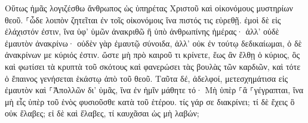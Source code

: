 \documentclass{openreader}
\begin{document}
Οὕτως ἡμᾶς λογιζέσθω ἄνθρωπος ὡς ὑπηρέτας Χριστοῦ καὶ οἰκονόμους μυστηρίων θεοῦ. 
⸀ὧδε λοιπὸν ζητεῖται ἐν τοῖς οἰκονόμοις ἵνα πιστός τις εὑρεθῇ. 
ἐμοὶ δὲ εἰς ἐλάχιστόν ἐστιν, ἵνα ὑφ’ ὑμῶν ἀνακριθῶ ἢ ὑπὸ ἀνθρωπίνης ἡμέρας· ἀλλ’ οὐδὲ ἐμαυτὸν ἀνακρίνω· 
οὐδὲν γὰρ ἐμαυτῷ σύνοιδα, ἀλλ’ οὐκ ἐν τούτῳ δεδικαίωμαι, ὁ δὲ ἀνακρίνων με κύριός ἐστιν. 
ὥστε μὴ πρὸ καιροῦ τι κρίνετε, ἕως ἂν ἔλθῃ ὁ κύριος, ὃς καὶ φωτίσει τὰ κρυπτὰ τοῦ σκότους καὶ φανερώσει τὰς βουλὰς τῶν καρδιῶν, καὶ τότε ὁ ἔπαινος γενήσεται ἑκάστῳ ἀπὸ τοῦ θεοῦ. 
Ταῦτα δέ, ἀδελφοί, μετεσχημάτισα εἰς ἐμαυτὸν καὶ ⸀Ἀπολλῶν δι’ ὑμᾶς, ἵνα ἐν ἡμῖν μάθητε τό· Μὴ ὑπὲρ ⸀ἃ ⸀γέγραπται, ἵνα μὴ εἷς ὑπὲρ τοῦ ἑνὸς φυσιοῦσθε κατὰ τοῦ ἑτέρου. 
τίς γάρ σε διακρίνει; τί δὲ ἔχεις ὃ οὐκ ἔλαβες; εἰ δὲ καὶ ἔλαβες, τί καυχᾶσαι ὡς μὴ λαβών; 
\end{document}
